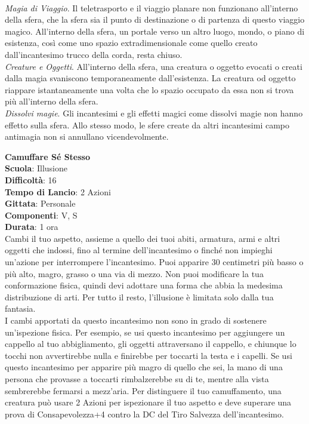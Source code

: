 \begin{multicols}{2}
\\\textit{Magia di Viaggio}. Il teletrasporto e il viaggio planare non funzionano all'interno della sfera, che la sfera sia il punto di destinazione o di partenza di questo viaggio magico. All'interno della sfera, un portale verso un altro luogo, mondo, o piano di esistenza, così come uno spazio extradimensionale come quello creato dall'incantesimo trucco della corda, resta chiuso.
\\\textit{Creature e Oggetti}. All'interno della sfera, una creatura o oggetto evocati o creati dalla magia svaniscono temporaneamente dall'esistenza. La creatura od oggetto riappare istantaneamente una volta che lo spazio occupato da essa non si trova più all'interno della sfera.
\\\textit{Dissolvi magie}. Gli incantesimi e gli effetti magici come dissolvi magie non hanno effetto sulla sfera. Allo stesso modo, le sfere create da altri incantesimi campo antimagia non si annullano vicendevolmente. 

\medskip\textbf{Camuffare Sé Stesso}\\
\textbf{Scuola}: Illusione\\
\textbf{Difficoltà}: 16\\
\textbf{Tempo di Lancio}: 2 Azioni\\
\textbf{Gittata}: Personale\\
\textbf{Componenti}: V, S\\
\textbf{Durata}: 1 ora\\
Cambi il tuo aspetto, assieme a quello dei tuoi abiti, armatura, armi e altri oggetti che indossi, fino al termine dell'incantesimo o finché non impieghi un'azione per interrompere l'incantesimo. Puoi apparire 30 centimetri più basso o più alto, magro, grasso o una via di mezzo. Non puoi modificare la tua conformazione fisica, quindi devi adottare una forma che abbia la medesima distribuzione di arti. Per tutto il resto, l'illusione è limitata solo dalla tua fantasia.\\
I cambi apportati da questo incantesimo non sono in grado di sostenere un'ispezione fisica. Per esempio, se usi questo incantesimo per aggiungere un cappello al tuo abbigliamento, gli oggetti attraversano il cappello, e chiunque lo tocchi non avvertirebbe nulla e finirebbe per toccarti la testa e i capelli. Se usi questo incantesimo per apparire più magro di quello che sei, la mano di una persona che provasse a toccarti rimbalzerebbe su di te, mentre alla vista sembrerebbe fermarsi a mezz'aria. Per distinguere il tuo camuffamento, una creatura può usare 2 Azioni per ispezionare il tuo aspetto e deve superare una prova di Consapevolezza+4 contro la DC del Tiro Salvezza dell'incantesimo. 


\end{multicols}
